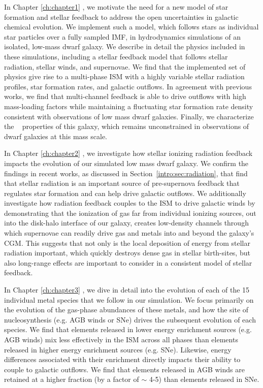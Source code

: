 In Chapter \ref{ch:chapter1} \citep[published as][]{Emerick2019}, we motivate the need for a new model of star formation and stellar feedback to address the open uncertainties in galactic chemical evolution. We implement such a model, which follows stars as individual star particles over a fully sampled IMF, in hydrodynamics simulations of an isolated, low-mass dwarf galaxy. We describe in detail the physics included in these simulations, including a stellar feedback model that follows stellar radiation, stellar winds, and supernovae. We find that the implemented set of physics give rise to a multi-phase ISM with a highly variable stellar radiation profiles, star formation rates, and galactic outflows. In agreement with previous works, we find that multi-channel feedback is able to drive outflows with high mass-loading factors while maintaining a fluctuating star formation rate density consistent with observations of low mass dwarf galaxies. Finally, we characterize the \Hmolecular~ properties of this galaxy, which remains unconstrained in observations of dwarf galaxies at this mass scale.

In Chapter \ref{ch:chapter2} \citep[published as][]{Emerick2018a}, we investigate how stellar ionizing radiation feedback impacts the evolution of our simulated low mass dwarf galaxy. We confirm the findings in recent works, as discussed in Section~\ref{intro:sec:radiation}, that find that stellar radiation is an important source of pre-supernova feedback that regulates star formation and can help drive galactic outflows. We additionally investigate how radiation feedback couples to the ISM to drive galactic winds by demonstrating that the ionization of gas far from individual ionizing sources, out into the disk-halo interface of our galaxy, creates low-density channels through which supernovae can readily drive gas and metals into and beyond the galaxy's CGM. This suggests that not only is the local deposition of energy from stellar radiation important, which quickly destroys dense gas in stellar birth-sites, but also long-range effects are important to consider in a consistent model of stellar feedback.

In Chapter \ref{ch:chapter3} \citep[published as][]{Emerick2018b}, we dive in detail into the evolution of each of the 15 individual metal species that we follow in our simulation. We focus primarily on the evolution of the gas-phase abundances of these metals, and how the site of nucleosynthesis (e.g. AGB winds or SNe) drives the subsequent evolution of each species. We find that elements released in lower energy enrichment sources (e.g. AGB winds) mix less effectively in the ISM across all phases than elements released in higher energy enrichment sources (e.g. SNe). Likewise, energy differences associated with their enrichment directly impacts their ability to couple to galactic outflows. We find that elements released in AGB winds are retained at a higher fraction (by a factor of $\sim$ 4-5) than elements released in SNe.


